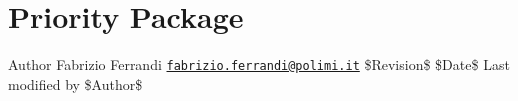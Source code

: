 \hypertarget{group__Priority}{}\section{Priority Package}
\label{group__Priority}
\begin{DoxyAuthor}{Author}
Fabrizio Ferrandi \href{mailto:fabrizio.ferrandi@polimi.it}{\tt fabrizio.\+ferrandi@polimi.\+it} \$\+Revision\$ \$\+Date\$ Last modified by \$\+Author\$ 
\end{DoxyAuthor}
